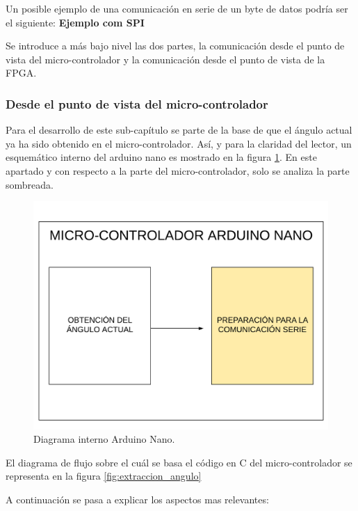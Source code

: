 Un posible ejemplo de una comunicación en serie de un byte de datos podría ser el siguiente: 
\textbf{Ejemplo com SPI}


Se introduce a más bajo nivel las dos partes, la comunicación desde el punto de vista del micro-controlador y la comunicación desde el punto de vista de la FPGA. 

\subsubsection{Desde el punto de vista del micro-controlador}

Para el desarrollo de este sub-capítulo se parte de la base de que el ángulo actual ya ha sido obtenido en el micro-controlador. Así, y para la claridad del lector, un esquemático interno del arduino nano es mostrado en la figura \ref{fig:coexistencia3}. En este apartado y con respecto a la parte del micro-controlador, solo se analiza la parte sombreada.  

\begin{figure}[H]
	\center
	\includegraphics[trim = 0mm 0mm 0mm 0mm, clip,scale=0.3]{imagenes/Balancing_robot/coexistencia3.pdf}
	\caption{Diagrama interno Arduino Nano.}
	\label{fig:coexistencia3}
\end{figure}

El diagrama de flujo sobre el cuál se basa el código en C del micro-controlador se representa en la figura \ref{fig:extraccion_angulo}

A continuación se pasa a explicar los aspectos mas relevantes: 


